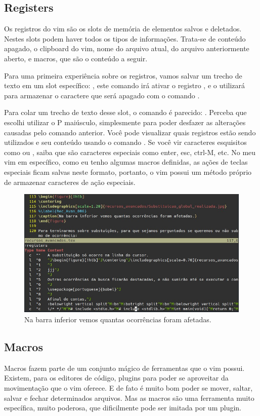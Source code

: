 \subsection{Registers}
Os registros do vim são os slots de memória de elementos salvos e deletados.
Nestes slots podem haver todos os tipos de informações.
Trata-se de conteúdo apagado, o clipboard do vim, nome do arquivo atual, do arquivo anteriormente aberto,
e macros, que são o conteúdo a seguir.

Para uma primeira experiência sobre os registros, vamos salvar um trecho de texto
em um slot específico: , este comando irá ativar o registro , e
o utilizará para armazenar o caractere que será apagado com o comando .

Para colar um trecho de texto desse slot, o comando é parecido: .
Perceba que escolhi utilizar o P maiúsculo, simplesmente para poder desfazer as alterações causadas pelo comando anterior.
Você pode visualizar quais registros estão sendo utilizados e seu conteúdo usando o comando .
Se você vir caracteres esquisitos como  ou \vimkeys{\^}, saiba que são caracteres especiais como 
enter, esc, ctrl-M, etc.
No meu vim em específico, como eu tenho algumas macros definidas, as ações de teclas especiais ficam salvas neste formato,
portanto, o vim possui um método próprio de armazenar caracteres de ação especiais.

\begin{figure}[!htb]
\centering
\includegraphics[scale=0.80]{recursos_avancados/Registers.jpg}
\caption{Na barra inferior vemos quantas ocorrências foram afetadas.}
\end{figure}

\subsection{Macros}
Macros fazem parte de um conjunto mágico de ferramentas que o vim possui.
Existem, para os editores de código, plugins para poder se aproveitar da movimentação que o vim oferece.
E de fato é muito bom poder se mover, saltar, salvar e fechar determinados arquivos.
Mas as macros são uma ferramenta muito específica, muito poderosa, que dificilmente pode ser imitada por um plugin.


